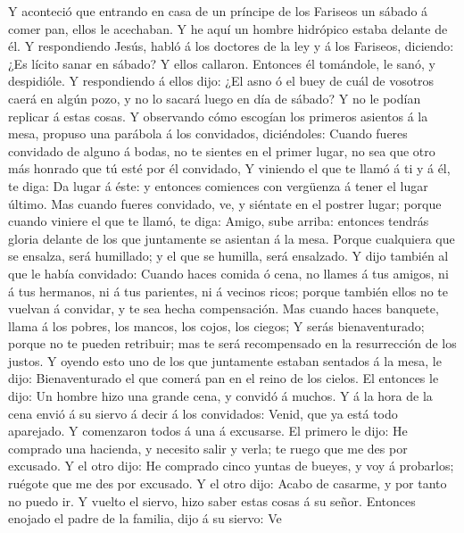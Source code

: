  Y aconteció que entrando en casa de un príncipe de los
Fariseos un sábado á comer pan, ellos le acechaban.  Y he
aquí un hombre hidrópico estaba delante de él.  Y
respondiendo Jesús, habló á los doctores de la ley y á los Fariseos,
diciendo: ¿Es lícito sanar en sábado?  Y ellos callaron.
Entonces él tomándole, le sanó, y despidióle.  Y
respondiendo á ellos dijo: ¿El asno ó el buey de cuál de vosotros caerá
en algún pozo, y no lo sacará luego en día de sábado?  Y
no le podían replicar á estas cosas.  Y observando cómo
escogían los primeros asientos á la mesa, propuso una parábola á los
convidados, diciéndoles:  Cuando fueres convidado de
alguno á bodas, no te sientes en el primer lugar, no sea que otro más
honrado que tú esté por él convidado,  Y viniendo el que
te llamó á ti y á él, te diga: Da lugar á éste: y entonces comiences con
vergüenza á tener el lugar último.  Mas cuando fueres
convidado, ve, y siéntate en el postrer lugar; porque cuando viniere el
que te llamó, te diga: Amigo, sube arriba: entonces tendrás gloria
delante de los que juntamente se asientan á la mesa. 
Porque cualquiera que se ensalza, será humillado; y el que se humilla,
será ensalzado.  Y dijo también al que le había
convidado: Cuando haces comida ó cena, no llames á tus amigos, ni á tus
hermanos, ni á tus parientes, ni á vecinos ricos; porque también ellos
no te vuelvan á convidar, y te sea hecha compensación. 
Mas cuando haces banquete, llama á los pobres, los mancos, los cojos,
los ciegos;  Y serás bienaventurado; porque no te pueden
retribuir; mas te será recompensado en la resurrección de los justos.
 Y oyendo esto uno de los que juntamente estaban sentados
á la mesa, le dijo: Bienaventurado el que comerá pan en el reino de los
cielos.  El entonces le dijo: Un hombre hizo una grande
cena, y convidó á muchos.  Y á la hora de la cena envió á
su siervo á decir á los convidados: Venid, que ya está todo aparejado.
 Y comenzaron todos á una á excusarse. El primero le
dijo: He comprado una hacienda, y necesito salir y verla; te ruego que
me des por excusado.  Y el otro dijo: He comprado cinco
yuntas de bueyes, y voy á probarlos; ruégote que me des por excusado.
 Y el otro dijo: Acabo de casarme, y por tanto no puedo
ir.  Y vuelto el siervo, hizo saber estas cosas á su
señor. Entonces enojado el padre de la familia, dijo á su siervo: Ve
